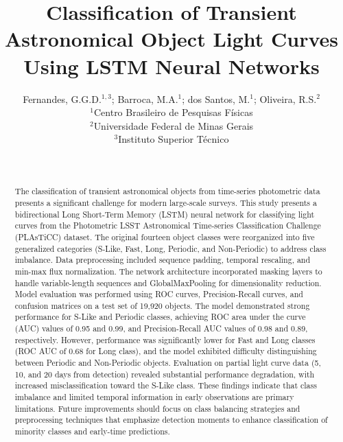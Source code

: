 \documentclass[a4paper,twoside,12pt]{article}
\title{Classification of Transient Astronomical Object Light Curves Using LSTM Neural Networks}
\author{%
Fernandes, G.G.D.$^{1,3}$; Barroca, M.A.$^1$; dos Santos, M.$^1$; Oliveira, R.S.$^2$\\ %
\footnotesize $^1$Centro Brasileiro de Pesquisas Físicas \\
\footnotesize $^2$Universidade Federal de Minas Gerais \\
\footnotesize $^3$Instituto Superior Técnico \\ %
\vspace{-0mm}
}
\date{~~~}
\begin{document}
\maketitle %

\thispagestyle{fancy} %

\vspace{-2.0cm}

\begin{abstract}

\vspace{-3mm}
\noindent The classification of transient astronomical objects from time-series photometric data presents a significant challenge for modern large-scale surveys. This study presents a bidirectional Long Short-Term Memory (LSTM) neural network for classifying light curves from the Photometric LSST Astronomical Time-series Classification Challenge (PLAsTiCC) dataset. The original fourteen object classes were reorganized into five generalized categories (S-Like, Fast, Long, Periodic, and Non-Periodic) to address class imbalance. Data preprocessing included sequence padding, temporal rescaling, and min-max flux normalization. The network architecture incorporated masking layers to handle variable-length sequences and GlobalMaxPooling for dimensionality reduction. Model evaluation was performed using ROC curves, Precision-Recall curves, and confusion matrices on a test set of 19,920 objects. The model demonstrated strong performance for S-Like and Periodic classes, achieving ROC area under the curve (AUC) values of 0.95 and 0.99, and Precision-Recall AUC values of 0.98 and 0.89, respectively. However, performance was significantly lower for Fast and Long classes (ROC AUC of 0.68 for Long class), and the model exhibited difficulty distinguishing between Periodic and Non-Periodic objects. Evaluation on partial light curve data (5, 10, and 20 days from detection) revealed substantial performance degradation, with increased misclassification toward the S-Like class. These findings indicate that class imbalance and limited temporal information in early observations are primary limitations. Future improvements should focus on class balancing strategies and preprocessing techniques that emphasize detection moments to enhance classification of minority classes and early-time predictions.
\end{abstract}
\end{document}
